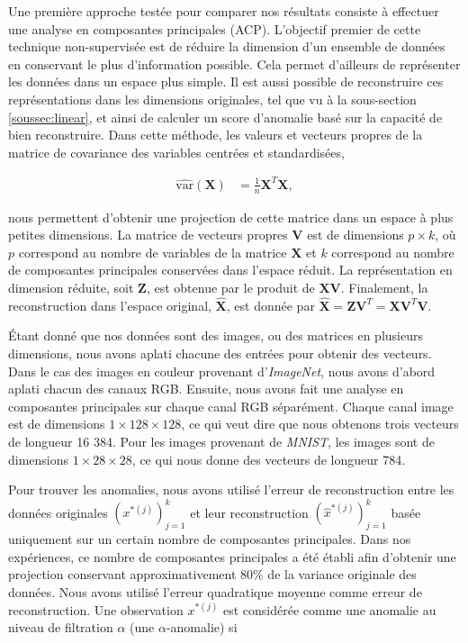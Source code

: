 Une première approche testée pour comparer nos résultats consiste à effectuer une analyse en composantes principales (ACP). L'objectif premier de cette technique non-supervisée est de réduire la dimension d'un ensemble de données en conservant le plus d'information possible. Cela permet d'ailleurs de représenter les données dans un espace plus simple. Il est aussi possible de reconstruire ces représentations dans les dimensions originales, tel que vu à la sous-section \ref{soussec:linear}, et ainsi de calculer un score d'anomalie basé sur la capacité de bien reconstruire. Dans cette méthode, les valeurs et vecteurs propres de la matrice de covariance des variables centrées et standardisées,

\begin{equation*} \label{eq1}
	\begin{split}
		\hat{\text{var}}(\mathbf{X}) & = \frac{1}{n}\mathbf{X}^{T}\mathbf{X},
	\end{split}
\end{equation*}


nous permettent d'obtenir une projection de cette matrice dans un espace à plus petites dimensions. La matrice de vecteurs propres $\mathbf{V}$ est de dimensions $p \times k$, où $p$ correspond au nombre de variables de la matrice $\mathbf{X}$ et $k$ correspond au nombre de composantes principales conservées dans l'espace réduit. La représentation en dimension réduite, soit $\mathbf{Z}$, est obtenue par le produit de $\mathbf{X}\mathbf{\mathbf{V}}$. Finalement, la reconstruction dans l'espace original, $\hat{\mathbf{X}}$, est donnée par $\hat{\mathbf{X}} = \mathbf{Z}\mathbf{V}^{T} = \mathbf{X} \mathbf{V}^{T} \mathbf{V}$.

Étant donné que nos données sont des images, ou des matrices en plusieurs dimensions, nous avons aplati chacune des entrées pour obtenir des vecteurs. Dans le cas des images en couleur provenant d'\textit{ImageNet}, nous avons d'abord aplati chacun des canaux RGB. Ensuite, nous avons fait une analyse en composantes principales sur chaque canal RGB séparément. Chaque canal image est de dimensions $1 \times 128 \times 128$, ce qui veut dire que nous obtenons trois vecteurs de longueur 16 384. Pour les images provenant de \textit{MNIST}, les images sont de dimensions $1 \times 28 \times 28$, ce qui nous donne des vecteurs de longueur 784.

Pour trouver les anomalies, nous avons utilisé l'erreur de reconstruction entre les données originales $(x^{*(j)})_{j=1}^k$ et
leur reconstruction $(\hat{x}^{*(j)})_{j=1}^k$ basée uniquement sur un certain nombre de composantes principales. Dans nos expériences, ce nombre de composantes principales a été établi afin d'obtenir une projection conservant approximativement 80\% de la variance originale des données. Nous avons utilisé l'erreur quadratique moyenne comme erreur de reconstruction. Une observation $x^{*(j)}$ est considérée comme une anomalie au niveau de filtration $\alpha$ (une $\alpha$-anomalie) si

